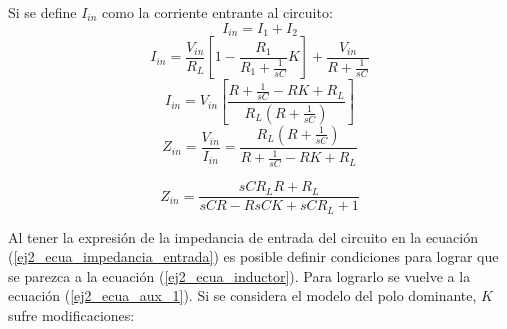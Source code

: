 Si se define $I_{in}$ como la corriente entrante al circuito:
\begin{displaymath} I_{in} = I_1 + I_2 \end{displaymath}
\begin{displaymath} I_{in} = \frac{V_{in}}{R_L}[1-\frac{R_1}{R_1 + \frac{1}{sC}}K]  + \frac{V_{in}}{R + \frac{1}{sC}}  \end{displaymath}
\begin{displaymath} I_{in} = V_{in}[\frac{R + \frac{1}{sC} - RK + R_L}{R_L (R + \frac{1}{sC})}]  \end{displaymath}
\begin{displaymath} Z_{in} = \frac{V_{in}}{I_{in}} = \frac{R_L (R + \frac{1}{sC})}{R + \frac{1}{sC} - RK + R_L }  \end{displaymath}

\begin{equation} Z_{in} = \frac{sC R_L R + R_L}{sCR - RsCK +sCR_L + 1} \label{ej2_ecua_impedancia_entrada}\end{equation}

Al tener la expresión de la impedancia de entrada del circuito en la ecuación (\ref{ej2_ecua_impedancia_entrada}) es posible definir condiciones para lograr que se parezca a la ecuación (\ref{ej2_ecua_inductor}).
Para lograrlo se vuelve a la ecuación (\ref{ej2_ecua_aux_1}). Si se considera el modelo del polo dominante, $K$ sufre modificaciones:

